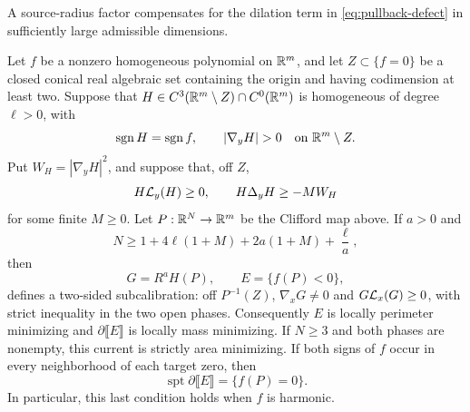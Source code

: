 \label{sec:clifford-area-transfer}

A source-radius factor compensates for the dilation term in
\eqref{eq:pullback-defect} in sufficiently large admissible dimensions.

\begin{theorem}
\label{thm:clifford-area-transfer}
Let \(f\) be a nonzero homogeneous polynomial on \(\mathbb R^m\), and let
\(Z\subset\{f=0\}\) be a closed conical real algebraic set containing
the origin and having codimension at least two.  Suppose that
\(H\in C^3(\mathbb R^m\setminus Z)\cap C^0(\mathbb R^m)\) is homogeneous of
degree \(\ell>0\), with
\[
 \operatorname{sgn}H=\operatorname{sgn}f,\qquad
 |\nabla_yH|>0\quad\text{on }\R^m\setminus Z.
\]
Put \(W_H=|\nabla_yH|^2\), and suppose that, off \(Z\),
\[
 H\mathcal L_y(H)\geq0,\qquad H\Delta_yH\geq-MW_H
\]
for some finite \(M\geq0\).  Let \(P:\mathbb R^N\to\mathbb R^m\) be the
Clifford map above.  If \(a>0\) and
\begin{equation}\label{eq:clifford-transfer-bound}
 N\geq1+4\ell(1+M)+2a(1+M)+\frac{\ell}{a},
\end{equation}
then
\[
 G=R^aH(P),\qquad E=\{f(P)<0\},
\]
defines a two-sided subcalibration: off \(P^{-1}(Z)\),
\(\nabla_xG\ne0\) and \(G\mathcal L_x(G)\geq0\), with strict inequality
in the two open phases.  Consequently \(E\) is locally perimeter
minimizing and \(\partial\llbracket E\rrbracket\) is locally mass
minimizing. If \(N\geq3\) and both phases are nonempty, this current
is strictly area minimizing. If both signs of \(f\) occur in every
neighborhood of each target zero, then
\[
 \operatorname{spt}\partial\llbracket E\rrbracket=\{f(P)=0\}.
\]
In particular, this last condition holds when \(f\) is harmonic.
\end{theorem}

